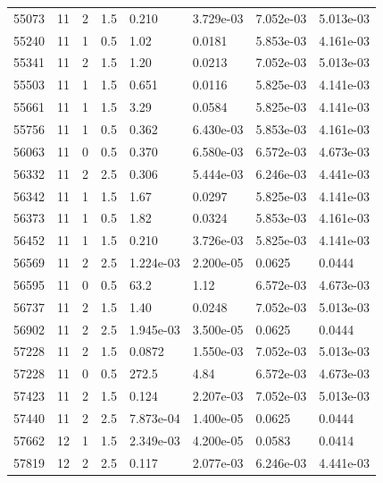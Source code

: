 \documentclass[preview]{standalone}
\begin{document}
{{{{{{{{{{\begin{tabular}{L{1.2cm}C{1.2cm} C{0.3cm}C{0.5cm} C{1.4cm}C{1.4cm} C{1.4cm}C{1.4cm}}
  55073  &    11  & 2     & 1.5 &  0.210  & 3.729e-03  & 7.052e-03 &  5.013e-03   \\ 
  55240  &    11  & 1     & 0.5 &  1.02  & 0.0181  & 5.853e-03 &  4.161e-03   \\ 
  55341  &    11  & 2     & 1.5 &  1.20  & 0.0213  & 7.052e-03 &  5.013e-03   \\ 
  55503  &    11  & 1     & 1.5 &  0.651  & 0.0116  & 5.825e-03 &  4.141e-03   \\ 
  55661  &    11  & 1     & 1.5 &  3.29  & 0.0584  & 5.825e-03 &  4.141e-03   \\ 
  55756  &    11  & 1     & 0.5 &  0.362  & 6.430e-03  & 5.853e-03 &  4.161e-03   \\ 
  56063  &    11  & 0     & 0.5 &  0.370  & 6.580e-03  & 6.572e-03 &  4.673e-03   \\ 
  56332  &    11  & 2     & 2.5 &  0.306  & 5.444e-03  & 6.246e-03 &  4.441e-03   \\ 
  56342  &    11  & 1     & 1.5 &  1.67  & 0.0297  & 5.825e-03 &  4.141e-03   \\ 
  56373  &    11  & 1     & 0.5 &  1.82  & 0.0324  & 5.853e-03 &  4.161e-03   \\ 
  56452  &    11  & 1     & 1.5 &  0.210  & 3.726e-03  & 5.825e-03 &  4.141e-03   \\ 
  56569  &    11  & 2     & 2.5 &  1.224e-03  & 2.200e-05  & 0.0625 &  0.0444   \\ 
  56595  &    11  & 0     & 0.5 &  63.2  & 1.12  & 6.572e-03 &  4.673e-03   \\ 
  56737  &    11  & 2     & 1.5 &  1.40  & 0.0248  & 7.052e-03 &  5.013e-03   \\ 
  56902  &    11  & 2     & 2.5 &  1.945e-03  & 3.500e-05  & 0.0625 &  0.0444   \\ 
  57228  &    11  & 2     & 1.5 &  0.0872  & 1.550e-03  & 7.052e-03 &  5.013e-03   \\ 
  57228  &    11  & 0     & 0.5 &  272.5  & 4.84  & 6.572e-03 &  4.673e-03   \\ 
  57423  &    11  & 2     & 1.5 &  0.124  & 2.207e-03  & 7.052e-03 &  5.013e-03   \\ 
  57440  &    11  & 2     & 2.5 &  7.873e-04  & 1.400e-05  & 0.0625 &  0.0444   \\ 
  57662  &    12  & 1     & 1.5 &  2.349e-03  & 4.200e-05  & 0.0583 &  0.0414   \\ 
  57819  &    12  & 2     & 2.5 &  0.117  & 2.077e-03  & 6.246e-03 &  4.441e-03   \\ 

\end{tabular}}}}}}}}}}}
\end{document}

